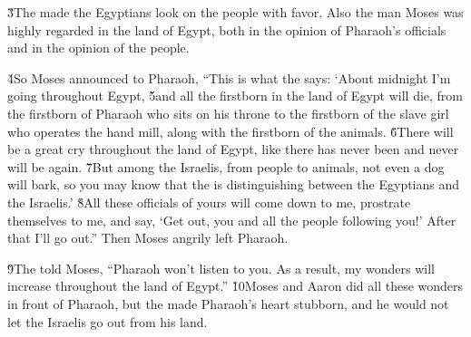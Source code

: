 \v{3}The  made the Egyptians look on the people with favor. Also the man Moses was highly regarded in the land of Egypt, both in the opinion of Pharaoh's officials and in the opinion of the people.

\v{4}So Moses announced to Pharaoh, ``This is what the  says: `About midnight I'm going throughout Egypt, \v{5}and all the firstborn in the land of Egypt will die, from the firstborn of Pharaoh who sits on his throne to the firstborn of the slave girl who operates the hand mill, along with the firstborn of the animals. \v{6}There will be a great cry throughout the land of Egypt, like there has never been and never will be again. \v{7}But among the Israelis, from people to animals, not even a dog will bark, so you may know that the  is distinguishing between the Egyptians and the Israelis.' \v{8}All these officials of yours will come down to me, prostrate themselves to me, and say, `Get out, you and all the people following you!' After that I'll go out.'' Then Moses angrily left Pharaoh.

\v{9}The  told Moses, ``Pharaoh won't listen to you. As a result, my wonders will increase throughout the land of Egypt.'' \v{10}Moses and Aaron did all these wonders in front of Pharaoh, but the  made Pharaoh's heart stubborn, and he would not let the Israelis go out from his land.

